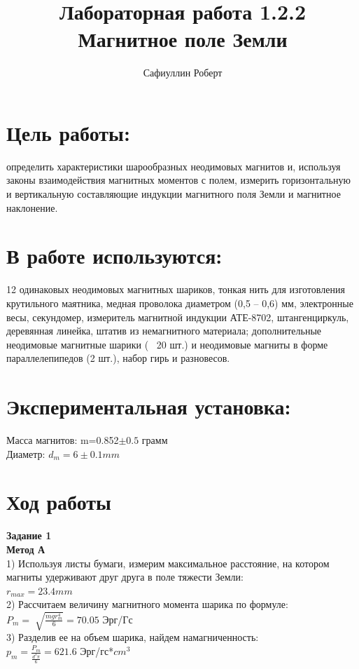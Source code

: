 \documentclass[a4paper,12pt]{article} %
\author{Сафиуллин Роберт	}
\title{Лабораторная работа 1.2.2\\ Магнитное поле Земли}
\begin{document}

\maketitle


\newpage

\section{Цель работы:}
 определить характеристики шарообразных неодимовых магнитов и, используя законы взаимодействия магнитных моментов с полем, измерить горизонтальную и вертикальную составляющие индукции магнитного поля Земли и магнитное наклонение.
\\
\section{В работе используются:}
12 одинаковых неодимовых магнитных шариков, тонкая нить для изготовления крутильного маятника, медная проволока диаметром (0,5 – 0,6) мм, электронные весы,
секундомер, измеритель магнитной индукции АТЕ-8702, штангенциркуль, деревянная линейка, штатив из немагнитного материала; дополнительные неодимовые магнитные шарики (~ 20 шт.) и неодимовые магниты в форме параллелепипедов (2 шт.), набор гирь и разновесов.


 
\section{Экспериментальная установка:}

Масса магнитов: m=0.852$\pm0.5$ грамм\\
Диаметр: $d_m=6\pm0.1 mm$


\section{Ход работы}
\textbf{Задание 1}\\
\textbf{Метод А}\\
1) Используя листы бумаги, измерим максимальное расстояние, на котором магниты удерживают друг друга в поле тяжести Земли:\\ $r_{max}=23.4 mm$\\
2) Рассчитаем величину магнитного момента шарика по формуле: \\
$P_m=\sqrt[]{\frac{mgr^4_m}{6}} =70.05 $ Эрг/Гс\\
3) Разделив ее на объем шарика, найдем намагниченность: \\
$p_m=\frac{P_m}{\frac{d^3\pi}{6}}=621.6$ Эрг/гс*$cm^3$\\
\end{document}
